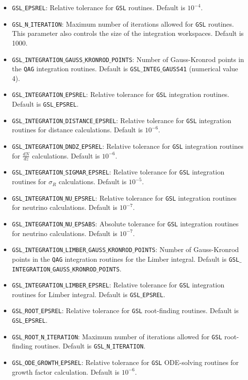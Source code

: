 \documentclass[\docopts]{\docclass}
\begin{document}
\begin{itemize}
\item {\tt GSL$\_$EPSREL}: Relative tolerance for {\tt GSL} routines. Default is $10^{-4}$.
\item {\tt GSL$\_$N$\_$ITERATION}: Maximum number of iterations allowed for {\tt GSL} routines. This parameter also controls the size of the integration workspaces. Default is 1000.
\item {\tt GSL$\_$INTEGRATION$\_$GAUSS$\_$KRONROD$\_$POINTS}: Number of Gauss-Kronrod points in the {\tt QAG} integration routines. Default is {\tt GSL$\_$INTEG$\_$GAUSS41} (numerical value 4).
\item {\tt GSL$\_$INTEGRATION$\_$EPSREL}: Relative tolerance for {\tt GSL} integration routines. Default is {\tt GSL$\_$EPSREL}.
\item {\tt GSL$\_$INTEGRATION$\_$DISTANCE$\_$EPSREL}: Relative tolerance for {\tt GSL} integration routines for distance calculations. Default is $10^{-6}$.
\item {\tt GSL$\_$INTEGRATION$\_$DNDZ$\_$EPSREL}: Relative tolerance for {\tt GSL} integration routines for  $\frac{dN}{dz}$ calculations. Default is $10^{-6}$.
\item {\tt GSL$\_$INTEGRATION$\_$SIGMAR$\_$EPSREL}: Relative tolerance for {\tt GSL} integration routines for  $\sigma_R$ calculations. Default is $10^{-5}$.
\item {\tt GSL$\_$INTEGRATION$\_$NU$\_$EPSREL}: Relative tolerance for {\tt GSL} integration routines for neutrino calculations. Default is $10^{-7}$.
\item {\tt GSL$\_$INTEGRATION$\_$NU$\_$EPSABS}: Absolute tolerance for {\tt GSL} integration routines for neutrino calculations. Default is $10^{-7}$.
\item {\tt GSL$\_$INTEGRATION$\_$LIMBER$\_$GAUSS$\_$KRONROD$\_$POINTS}: Number of Gauss-Kronrod points in the {\tt QAG} integration routines for the Limber integral. Default is {\tt GSL$\_$INTEGRATION$\_$GAUSS$\_$KRONROD$\_$POINTS}.
\item {\tt GSL$\_$INTEGRATION$\_$LIMBER$\_$EPSREL}: Relative tolerance for {\tt GSL} integration routines for Limber integral. Default is {\tt GSL$\_$EPSREL}.
\item {\tt GSL$\_$ROOT$\_$EPSREL}: Relative tolerance for {\tt GSL} root-finding routines. Default is {\tt GSL$\_$EPSREL}.
\item {\tt GSL$\_$ROOT$\_$N$\_$ITERATION}: Maximum number of iterations allowed for {\tt GSL} root-finding routines. Default is {\tt GSL$\_$N$\_$ITERATION}.
\item {\tt GSL$\_$ODE$\_$GROWTH$\_$EPSREL}: Relative tolerance for {\tt GSL} ODE-solving routines for growth factor calculation. Default is $10^{-6}$.
\end{itemize}
\end{document}
